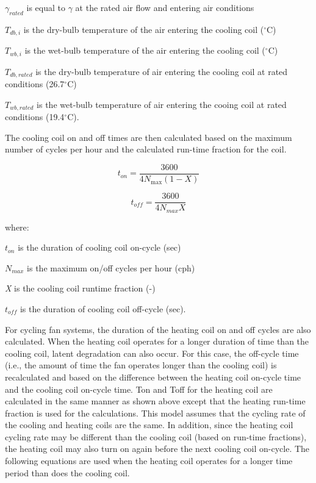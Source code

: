 \({\gamma_{rated}}\) is equal to \(\gamma\) at the rated air flow and entering air conditions

\(T_{db,i}\) is the dry-bulb temperature of the air entering the cooling coil (\(^{\circ}\)C)

\(T_{wb,i}\) is the wet-bulb temperature of the air entering the cooling coil (\(^{\circ}\)C)

\(T_{db,rated}\) is the dry-bulb temperature of air entering the cooling coil at rated conditions (26.7\(^{\circ}\)C)

\(T_{wb,rated}\) is the wet-bulb temperature of air entering the cooing coil at rated conditions (19.4\(^{\circ}\)C).

The cooling coil on and off times are then calculated based on the maximum number of cycles per hour and the calculated run-time fraction for the coil.

\begin{equation}
{t_{on}} = \frac{{3600}}{{4{N_{\max }}\left( {1 - X} \right)}}
\end{equation}

\begin{equation}
{t_{off}} = \frac{{3600}}{{4{N_{max}}X}}
\end{equation}

where:

\(t_{on}\) is the duration of cooling coil on-cycle (sec)

\(N_{max}\) is the maximum on/off cycles per hour (cph)

\emph{X} is the cooling coil runtime fraction (-)

\(t_{off}\) is the duration of cooling coil off-cycle (sec).

For cycling fan systems, the duration of the heating coil on and off cycles are also calculated. When the heating coil operates for a longer duration of time than the cooling coil, latent degradation can also occur. For this case, the off-cycle time (i.e., the amount of time the fan operates longer than the cooling coil) is recalculated and based on the difference between the heating coil on-cycle time and the cooling coil on-cycle time. Ton and Toff for the heating coil are calculated in the same manner as shown above except that the heating run-time fraction is used for the calculations. This model assumes that the cycling rate of the cooling and heating coils are the same. In addition, since the heating coil cycling rate may be different than the cooling coil (based on run-time fractions), the heating coil may also turn on again before the next cooling coil on-cycle. The following equations are used when the heating coil operates for a longer time period than does the cooling coil.

